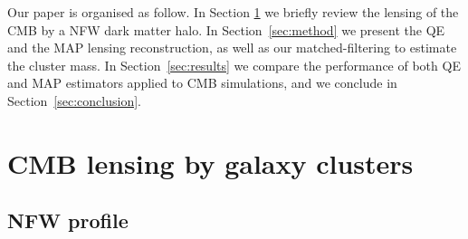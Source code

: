 \documentclass[prd, superscriptaddress, tightenlines, longbibliography, nofootinbib, eqsecnum, amsfonts, amsmath, floatfix, twocolumn, notitlepage]{revtex4-2}
\newcommand{\JC}[1]{\color{purple}{{JC:#1}}\color{black}\xspace}
\newcommand{\LL}[1]{{\color{orange}{LL: #1}}}
\begin{document}

Our paper is organised as follow. In Section \ref{sec:model} we briefly review the lensing of the CMB by a NFW dark matter halo. In Section~\ref{sec:method} we present the QE and the MAP lensing reconstruction, as well as our matched-filtering to estimate the cluster mass. In Section~\ref{sec:results} we compare the performance of both QE and MAP estimators applied to CMB simulations, and we conclude in Section~\ref{sec:conclusion}.


\section{CMB lensing by galaxy clusters}
\label{sec:model}
\subsection{NFW profile}
\end{document}
